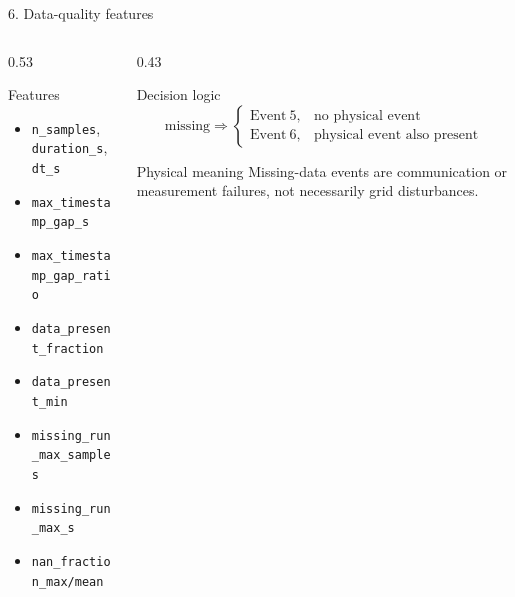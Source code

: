 \documentclass[10pt,aspectratio=169]{beamer}
\newcommand{\code}[1]{\texttt{\footnotesize #1}}
\begin{document}
\begin{frame}{6. Data-quality features}
\small
\begin{columns}[T,totalwidth=\textwidth]
\begin{column}{0.53\textwidth}
\begin{block}{Features}
\begin{itemize}
  \item \code{n\_samples}, \code{duration\_s}, \code{dt\_s}
  \item \code{max\_timestamp\_gap\_s}
  \item \code{max\_timestamp\_gap\_ratio}
  \item \code{data\_present\_fraction}
  \item \code{data\_present\_min}
  \item \code{missing\_run\_max\_samples}
  \item \code{missing\_run\_max\_s}
  \item \code{nan\_fraction\_max/mean}
\end{itemize}
\end{block}
\end{column}
\begin{column}{0.43\textwidth}
\begin{alertblock}{Decision logic}
\[
\mathrm{missing} \Rightarrow
\begin{cases}
\mathrm{Event\ 5}, & \text{no physical event}\\
\mathrm{Event\ 6}, & \text{physical event also present}
\end{cases}
\]
\end{alertblock}
\begin{exampleblock}{Physical meaning}
Missing-data events are communication or measurement failures, not necessarily grid disturbances.
\end{exampleblock}
\end{column}
\end{columns}
\end{frame}
\end{document}
